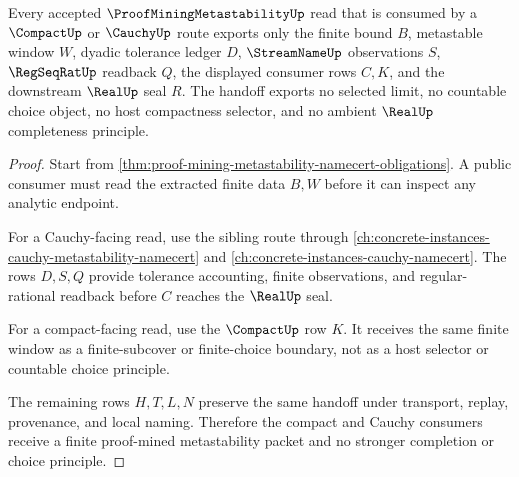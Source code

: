 \begin{theorem}
\label{thm:proof-mining-metastability-compact-cauchy-handoff}
Every accepted $\ProofMiningMetastabilityUp$ read that is consumed by a $\CompactUp$ or $\CauchyUp$ route exports only the finite bound $B$, metastable window $W$, dyadic tolerance ledger $D$, $\StreamNameUp$ observations $S$, $\RegSeqRatUp$ readback $Q$, the displayed consumer rows $C,K$, and the downstream $\RealUp$ seal $R$. The handoff exports no selected limit, no countable choice object, no host compactness selector, and no ambient $\RealUp$ completeness principle.
\end{theorem}
\begin{proof}
Start from \autoref{thm:proof-mining-metastability-namecert-obligations}. A public consumer must read the extracted finite data $B,W$ before it can inspect any analytic endpoint.

For a Cauchy-facing read, use the sibling route through \autoref{ch:concrete-instances-cauchy-metastability-namecert} and \autoref{ch:concrete-instances-cauchy-namecert}. The rows $D,S,Q$ provide tolerance accounting, finite observations, and regular-rational readback before $C$ reaches the $\RealUp$ seal.

For a compact-facing read, use the $\CompactUp$ row $K$. It receives the same finite window as a finite-subcover or finite-choice boundary, not as a host selector or countable choice principle.

The remaining rows $H,T,L,N$ preserve the same handoff under transport, replay, provenance, and local naming. Therefore the compact and Cauchy consumers receive a finite proof-mined metastability packet and no stronger completion or choice principle.
\end{proof}


\begin{closurestatus}{\ProofMiningMetastabilityUp}
  \theoryclosure{\seedClosure}
  \formalstatus{\unformalizedV}
\end{closurestatus}

